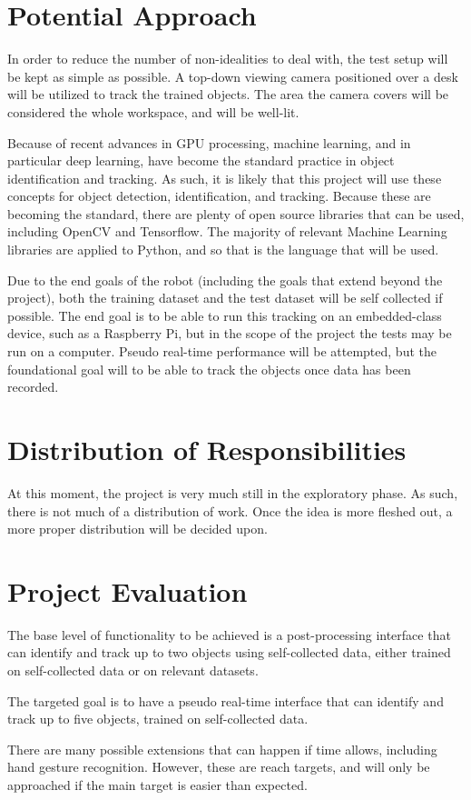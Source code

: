 \documentclass[11pt]{article}
\begin{document}
\section{Potential Approach}
\par In order to reduce the number of non-idealities to deal with, the test setup will be kept as simple as possible. A top-down viewing camera positioned over a desk will be utilized to track the trained objects. The area the camera covers will be considered the whole workspace, and will be well-lit.  
\par Because of recent advances in GPU processing, machine learning, and in particular deep learning, have become the standard practice in object identification and tracking. As such, it is likely that this project will use these concepts for object detection, identification, and tracking. Because these are becoming the standard, there are plenty of open source libraries that can be used, including OpenCV and Tensorflow. The majority of relevant Machine Learning libraries are applied to Python, and so that is the language that will be used.
\par Due to the end goals of the robot (including the goals that extend beyond the project), both the training dataset and the test dataset will be self collected if possible. The end goal is to be able to run this tracking on an embedded-class device, such as a Raspberry Pi, but in the scope of the project the tests may be run on a computer. Pseudo real-time performance will be attempted, but the foundational goal will to be able to track the objects once data has been recorded.
\section{Distribution of Responsibilities}
\par At this moment, the project is very much still in the exploratory phase. As such, there is not much of a distribution of work. Once the idea is more fleshed out, a more proper distribution will be decided upon.
\section{Project Evaluation}
\par The base level of functionality to be achieved is a post-processing interface that can identify and track up to two objects using self-collected data, either trained on self-collected data or on relevant datasets. 
\par The targeted goal is to have a pseudo real-time interface that can identify and track up to five objects, trained on self-collected data.
\par There are many possible extensions that can happen if time allows, including hand gesture recognition. However, these are reach targets, and will only be approached if the main target is easier than expected. 
\end{document}
